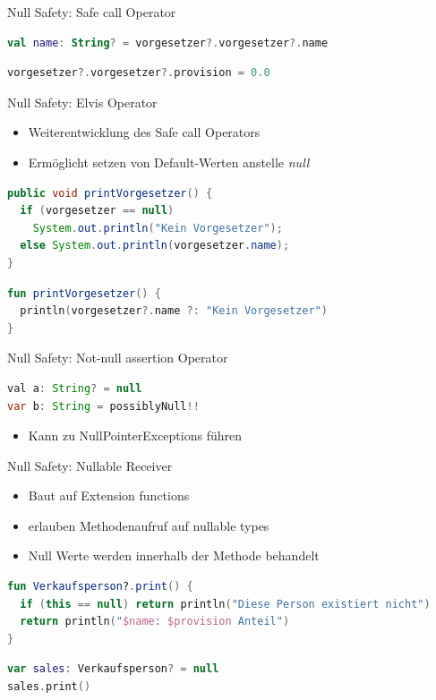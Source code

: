 \documentclass{beamer}
\begin{document}
\begin{frame}[fragile]{Null Safety: Safe call Operator}
  \begin{lstlisting}[language=Kotlin, title=Verkettung des Operators]
val name: String? = vorgesetzer?.vorgesetzer?.name   
  \end{lstlisting}
  \pause
  \begin{lstlisting}[language=Kotlin, title=Zuweisungen mit dem Operator]
vorgesetzer?.vorgesetzer?.provision = 0.0
  \end{lstlisting}
\end{frame}

\begin{frame}[fragile]{Null Safety: Elvis Operator}
  \begin{itemize}[<+->]
    \item Weiterentwicklung des Safe call Operators
    \item Ermöglicht setzen von Default-Werten anstelle \textit{null}
  \end{itemize}
  \pause
  \begin{lstlisting}[language=Java]
public void printVorgesetzer() {
  if (vorgesetzer == null)
    System.out.println("Kein Vorgesetzer");
  else System.out.println(vorgesetzer.name);
}   
  \end{lstlisting}
  \pause
  \begin{lstlisting}[language=Kotlin]
fun printVorgesetzer() {
  println(vorgesetzer?.name ?: "Kein Vorgesetzer")
}
  \end{lstlisting}
\end{frame}

\begin{frame}[fragile]{Null Safety: Not-null assertion Operator}
  \begin{lstlisting}[language=Java]
val a: String? = null
var b: String = possiblyNull!!
  \end{lstlisting}
  \pause
  \begin{itemize}[<+->]
    \item Kann zu NullPointerExceptions führen
  \end{itemize}
\end{frame}

\begin{frame}[fragile]{Null Safety: Nullable Receiver}
  \begin{itemize}[<+->]
    \item Baut auf Extension functions
    \item erlauben Methodenaufruf auf nullable types
    \item Null Werte werden innerhalb der Methode behandelt
  \end{itemize}
  \pause \vspace{1cm}
  \begin{lstlisting}[language=Kotlin]
fun Verkaufsperson?.print() {
  if (this == null) return println("Diese Person existiert nicht")
  return println("$name: $provision Anteil")
}
  \end{lstlisting}
  \pause
  \begin{lstlisting}[language=Kotlin]
var sales: Verkaufsperson? = null
sales.print()
  \end{lstlisting}
\end{frame}
\end{document}
